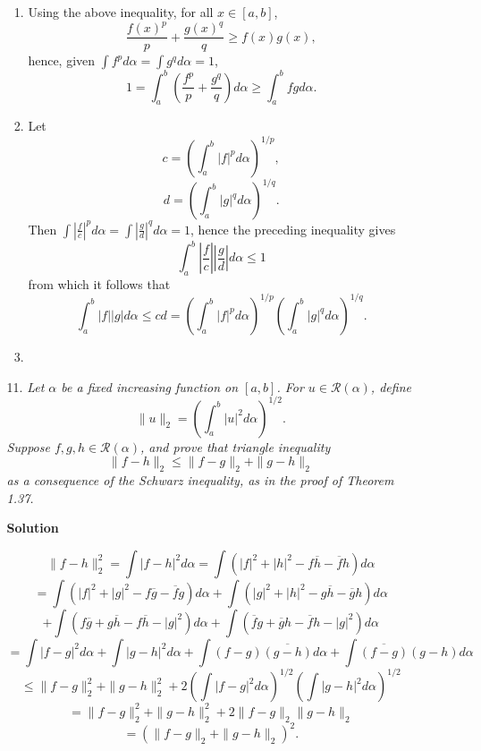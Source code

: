 \documentclass{article}
\begin{document}
\begin{enumerate}
\begin{itemize}
\begin{enumerate}
\item Using the above inequality, for all \(x \in [a,b]\),
\[\frac{f(x)^p}{p} + \frac{g(x)^q}{q} \geq f(x) g(x),\]
hence, given \(\int f^p d\alpha = \int g^q d\alpha = 1\),
\[1 = \int_a^b \left( \frac{f^p}{p} + \frac{g^q}{q} \right) d\alpha \geq \int_a^b fg d\alpha.\]

\item Let
\[c = \left( \int_a^b |f|^p d\alpha \right)^{1/p},\]
\[d = \left( \int_a^b |g|^q d\alpha \right)^{1/q}.\]
Then \(\int \left| \frac{f}{c} \right|^p d\alpha = \int \left| \frac{g}{d} \right|^q d\alpha = 1\), hence the preceding inequality gives
\[\int_a^b \left| \frac{f}{c} \right| \left| \frac{g}{d} \right| d\alpha \leq 1\]
from which it follows that
\[\int_a^b |f| |g| d\alpha \leq cd = \left( \int_a^b |f|^p d\alpha \right)^{1/p} \left( \int_a^b |g|^q d\alpha \right)^{1/q}.\]

\item

\end{enumerate}



\item[11.] {\em Let \(\alpha\) be a fixed increasing function on \([a,b]\).  For \(u \in \mathcal{R}(\alpha)\), define
\[\|u\|_2 = \left( \int_a^b |u|^2 d\alpha \right)^{1/2}.\]
Suppose \(f,g,h \in \mathcal{R}(\alpha)\), and prove that triangle inequality
\[\|f - h\|_2 \leq \|f - g\|_2 + \|g - h\|_2\]
as a consequence of the Schwarz inequality, as in the proof of Theorem 1.37.}

{\bf Solution}

\[\|f - h\|_2^2
     = \int |f - h|^2 d\alpha
     = \int \left( |f|^2 + |h|^2 - f\overline{h} - \overline{f}h \right) d\alpha\]
\[   = \int \left( |f|^2 + |g|^2 - f\overline{g} - \overline{f}g \right) d\alpha
     + \int \left( |g|^2 + |h|^2 - g\overline{h} - \overline{g}h \right) d\alpha\]
\[   + \int \left( f\overline{g} + g\overline{h} - f\overline{h} - |g|^2 \right) d\alpha
     + \int \left( \overline{f}g + \overline{g}h - \overline{f}h - |g|^2 \right) d\alpha\]
\[   = \int |f - g|^2 d\alpha + \int |g - h|^2 d\alpha
     + \int (f - g) \overline{(g - h)} d\alpha + \int \overline{(f - g)} (g - h) d\alpha\]
\[\leq \|f - g\|_2^2 + \|g - h\|_2^2
     + 2 \left( \int |f - g|^2 d\alpha \right)^{1/2} \left( \int |g - h|^2 d\alpha \right)^{1/2}\]
\[   = \|f - g\|_2^2 + \|g - h\|_2^2 + 2 \|f - g\|_2 \|g - h\|_2\]
\[   = \left( \|f - g\|_2 + \|g - h\|_2 \right)^2.\]




\end{itemize}
\end{enumerate}
\end{document}
